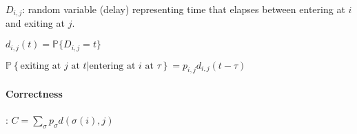 \documentclass[6pt]{scrartcl}
\begin{document}
\begin{multicols}{4}
$D_{i,j}$: random variable (delay) representing time that elapses between entering at $i$ and exiting at $j$.

$d_{i,j}(t) = \mathbb{P} \{D_{i,j} = t \}$

$\mathbb{P} \left\{ \text{exiting at } j \text{ at } t | \text{entering at } i \text{ at } \tau \right\} = p_{i,j} d_{i,j}(t - \tau)$

\paragraph{Correctness}: $C = \sum_\sigma p_\sigma d(\sigma(i), j)$

\begin{comment}
\subsection{RFID}
\paragraph{Standard tags possibilities}: Kill, Sleep, Rename, Block, (Legislation).
\paragraph{Crypto enabled tags possibilities}: Tree-approach, synchronization approach, hash chain based approach.
\paragraph{Singulation} (determining which tags are present around the reader) Binary tree walking: reader first asks the tags to emit the first bit of their ID. If every answer is 0 (or 1) the reader knows on which side the ID's are. This is done recursively until all ID's are determined. A \textbf{collision} is the event where ID's on both sides of a node answer and both sides must be recursed upon.

\paragraph{Privacy zone} A tag ID can be changed so that it lies in the \emph{private} zone of the tree. A special device simulates collisions for every query in this area, so an exhaustive search would be required to find a tag. 

\paragraph{Pseudonyms} Tags can be set to use different ID's that an authorized reader would know how to correlate. To avoid having too complex tags, the reader will generally be responsible for \emph{refilling} the pseudonyms. This will be done in cleartext and assumes an attacker does not always listen.


\end{comment}
\end{multicols}
\end{document}
